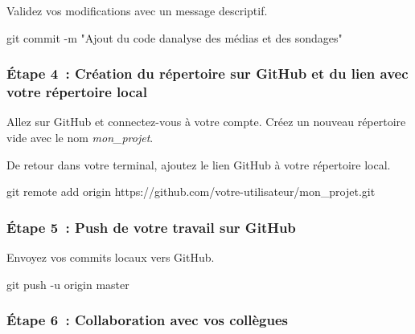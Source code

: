 \documentclass[
  letterpaper,
]{scrbook}
\newenvironment{Shaded}{\begin{snugshade}}{\end{snugshade}}
\newcommand{\AttributeTok}[1]{\textcolor[rgb]{0.40,0.45,0.13}{#1}}
\newcommand{\FunctionTok}[1]{\textcolor[rgb]{0.28,0.35,0.67}{#1}}
\newcommand{\NormalTok}[1]{\textcolor[rgb]{0.00,0.23,0.31}{#1}}
\newcommand{\StringTok}[1]{\textcolor[rgb]{0.13,0.47,0.30}{#1}}
\begin{document}
Validez vos modifications avec un message descriptif.

\begin{Shaded}
\begin{Highlighting}[]
\FunctionTok{git}\NormalTok{ commit }\AttributeTok{{-}m} \StringTok{"Ajout du code d\textquotesingle{}analyse des médias et des sondages"}
\end{Highlighting}
\end{Shaded}

\hypertarget{uxe9tape-4-cruxe9ation-du-ruxe9pertoire-sur-github-et-du-lien-avec-votre-ruxe9pertoire-local}{%
\subsubsection{Étape 4~: Création du répertoire sur GitHub et du lien
avec votre répertoire
local}\label{uxe9tape-4-cruxe9ation-du-ruxe9pertoire-sur-github-et-du-lien-avec-votre-ruxe9pertoire-local}}

Allez sur GitHub et connectez-vous à votre compte. Créez un nouveau
répertoire vide avec le nom \emph{mon\_projet}.

De retour dans votre terminal, ajoutez le lien GitHub à votre répertoire
local.

\begin{Shaded}
\begin{Highlighting}[]
\FunctionTok{git}\NormalTok{ remote add origin https://github.com/votre{-}utilisateur/mon\_projet.git}
\end{Highlighting}
\end{Shaded}

\hypertarget{uxe9tape-5-push-de-votre-travail-sur-github}{%
\subsubsection{Étape 5~: Push de votre travail sur
GitHub}\label{uxe9tape-5-push-de-votre-travail-sur-github}}

Envoyez vos commits locaux vers GitHub.

\begin{Shaded}
\begin{Highlighting}[]
\FunctionTok{git}\NormalTok{ push }\AttributeTok{{-}u}\NormalTok{ origin master}
\end{Highlighting}
\end{Shaded}

\hypertarget{uxe9tape-6-collaboration-avec-vos-colluxe8gues}{%
\subsubsection{Étape 6~: Collaboration avec vos
collègues}\label{uxe9tape-6-collaboration-avec-vos-colluxe8gues}}
\end{document}
